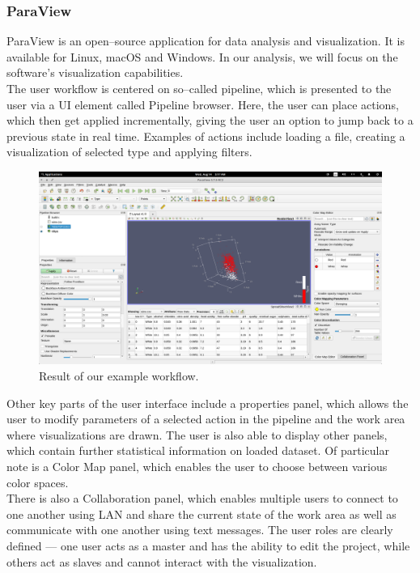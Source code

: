 \documentclass{article}
\begin{document}
\subsubsection{ParaView}

ParaView is an open--source application for data analysis and visualization.\cite{paraview} It is available for Linux, macOS and Windows. In our analysis, we will focus on the software's visualization capabilities.\\

The user workflow is centered on so--called pipeline, which is presented to the user via a UI element called Pipeline browser. Here, the user can place actions, which then get applied incrementally, giving the user an option to jump back to a previous state in real time. Examples of actions include loading a file, creating a visualization of selected type and applying filters.\\

\begin{figure}[!h]
\centering
\includegraphics[scale=0.18]{images/paraview}
\caption{Result of our example workflow.}
\label{fig:paraview}
\end{figure}

Other key parts of the user interface include a properties panel, which allows the user to modify parameters of a selected action in the pipeline and the work area where visualizations are drawn. The user is also able to display other panels, which contain further statistical information on loaded dataset. Of particular note is a Color Map panel, which enables the user to choose between various color spaces.\\

There is also a Collaboration panel, which enables multiple users to connect to one another using LAN and share the current state of the work area as well as communicate with one another using text messages. The user roles are clearly defined --- one user acts as a master and has the ability to edit the project, while others act as slaves and cannot interact with the visualization.\\
\end{document}
